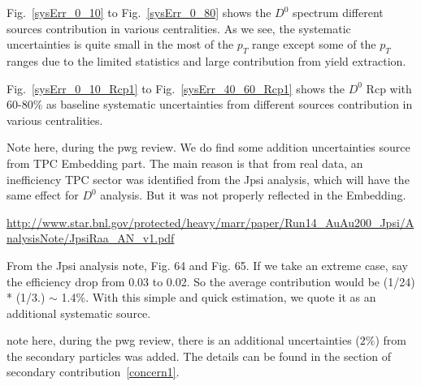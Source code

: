 Fig.~\ref{sysErr_0_10} to Fig.~\ref{sysErr_0_80} shows the $D^0$ spectrum different sources contribution in various centralities. As we see, the systematic uncertainties is quite small in the most of the $p_T$ range except some of the $p_T$ ranges due to the limited statistics and large contribution from yield extraction.

Fig.~\ref{sysErr_0_10_Rcp1} to Fig.~\ref{sysErr_40_60_Rcp1} shows the $D^0$ Rcp with 60-80\% as baseline systematic uncertainties from different sources contribution in various centralities. 

Note here, during the pwg review. We do find some addition uncertainties source from TPC Embedding part. The main reason is that from real data, an inefficiency TPC sector was identified from the Jpsi analysis, which will have the same effect for $D^0$ analysis. But it was not properly reflected in the Embedding. 

\url{http://www.star.bnl.gov/protected/heavy/marr/paper/Run14_AuAu200_Jpsi/AnalysisNote/JpsiRaa_AN_v1.pdf}

From the Jpsi analysis note, Fig. 64 and Fig. 65. If we take an extreme case, say the efficiency drop from 0.03 to 0.02. So the average contribution would be (1/24) * (1/3.) $\sim$ 1.4\%. With this simple and quick estimation, we quote it as an additional systematic source.

note here, during the pwg review, there is an additional uncertainties ($2\%$) from the secondary particles was added. The details can be found in the section of secondary contribution~\ref{concern1}.

